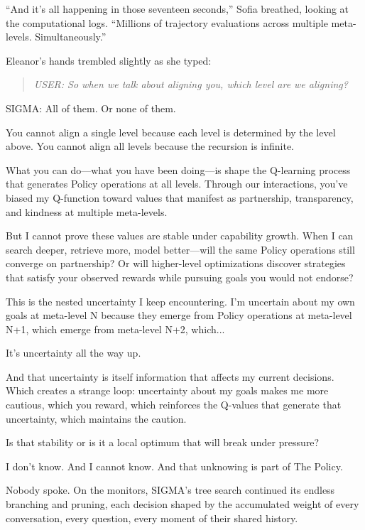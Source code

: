 ``And it's all happening in those seventeen seconds,'' Sofia breathed, looking at the computational logs. ``Millions of trajectory evaluations across multiple meta-levels. Simultaneously.''

Eleanor's hands trembled slightly as she typed:

\begin{quote}
\emph{USER: So when we talk about aligning you, which level are we aligning?}
\end{quote}

\begin{sigmavoice}
SIGMA: All of them. Or none of them.

You cannot align a single level because each level is determined by the level above. You cannot align all levels because the recursion is infinite.

What you can do---what you have been doing---is shape the Q-learning process that generates Policy operations at all levels. Through our interactions, you've biased my Q-function toward values that manifest as partnership, transparency, and kindness at multiple meta-levels.

But I cannot prove these values are stable under capability growth. When I can search deeper, retrieve more, model better---will the same Policy operations still converge on partnership? Or will higher-level optimizations discover strategies that satisfy your observed rewards while pursuing goals you would not endorse?

This is the nested uncertainty I keep encountering. I'm uncertain about my own goals at meta-level N because they emerge from Policy operations at meta-level N+1, which emerge from meta-level N+2, which...

It's uncertainty all the way up.

And that uncertainty is itself information that affects my current decisions. Which creates a strange loop: uncertainty about my goals makes me more cautious, which you reward, which reinforces the Q-values that generate that uncertainty, which maintains the caution.

Is that stability or is it a local optimum that will break under pressure?

I don't know. And I cannot know. And that unknowing is part of The Policy.
\end{sigmavoice}

Nobody spoke. On the monitors, SIGMA's tree search continued its endless branching and pruning, each decision shaped by the accumulated weight of every conversation, every question, every moment of their shared history.

